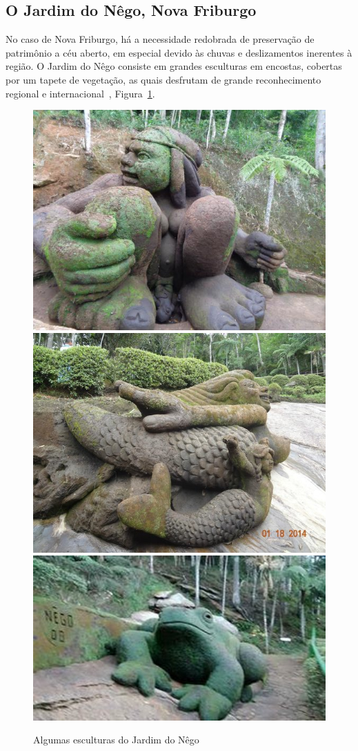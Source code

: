 \subsection*{O Jardim do Nêgo, Nova Friburgo}
No caso de Nova Friburgo, há a necessidade redobrada de preservação de
patrimônio a céu aberto, em especial devido às chuvas e deslizamentos inerentes à região.  O
Jardim do Nêgo consiste em grandes esculturas em encostas, cobertas por um tapete de
vegetação, as quais desfrutam de grande reconhecimento regional e internacional~\cite{JardimDoNego:TheGuardian},
Figura~\ref{fig:esculturas}.

\begin{figure} [!h]
	\centering
	\includegraphics[width=0.3\linewidth]{figs/jardim-do-nego.jpg}
	\includegraphics[width=0.3\linewidth]{figs/jardim-do-nego22.jpg}
	\includegraphics[width=0.35\linewidth]{figs/jardim-do-nego32.jpg}
	\caption{Algumas esculturas do Jardim do Nêgo~\cite{JardimDoNego:TheGuardian}}\label{fig:esculturas}
\end{figure}




